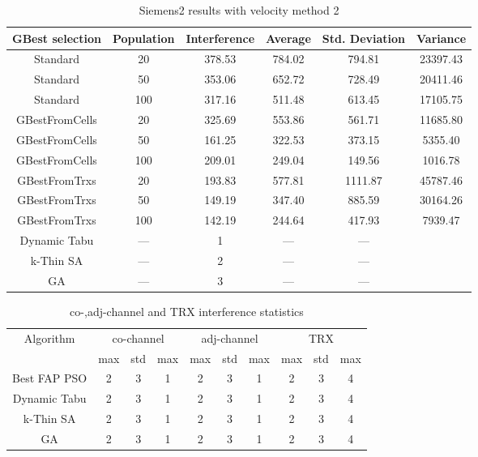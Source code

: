 \begin{table}[H]
\centering
	\begin{tabular}{cccccc}
	\toprule
    GBest selection & Population & Interference & Average & Std. Deviation & Variance \\
    \midrule
    Standard & 20 & 378.53 & 784.02 & 794.81 & 23397.43\\
    Standard & 50 & 353.06 & 652.72 & 728.49 & 20411.46\\
    Standard & 100 & 317.16 & 511.48 & 613.45 & 17105.75\\
    GBestFromCells & 20 & 325.69 & 553.86 & 561.71 & 11685.80\\
    GBestFromCells & 50 & 161.25 & 322.53 & 373.15 & 5355.40\\
    GBestFromCells & 100 & 209.01 & 249.04 & 149.56 & 1016.78\\
    GBestFromTrxs & 20 & 193.83 & 577.81 & 1111.87 & 45787.46\\
    GBestFromTrxs & 50 & 149.19 & 347.40 & 885.59 & 30164.26\\
    GBestFromTrxs & 100 & 142.19 & 244.64 & 417.93 & 7939.47\\
    Dynamic Tabu & --- & 1 & --- & --- \\
    k-Thin SA & --- & 2 & --- & --- \\
    GA & --- & 3 & --- & --- \\
    \bottomrule
	\end{tabular}
\caption{Siemens2 results with velocity method 2}
\label{tab:siem2m2}
\end{table}
\begin{table}[H]
\centering
	\begin{tabular}{cccccccccc}
	\toprule
    Algorithm & \multicolumn{3}{c}{co-channel} & \multicolumn{3}{c}{adj-channel} & \multicolumn{3}{c}{TRX}\\
              & max & std & max
              & max & std & max
              & max & std & max\\
    \midrule
    Best FAP PSO & 2 & 3 & 1 & 2 & 3 & 1 & 2 & 3 & 4\\ \hline
    Dynamic Tabu & 2 & 3 & 1 & 2 & 3 & 1 & 2 & 3 & 4\\\hline
    k-Thin SA & 2 & 3 & 1 & 2 & 3 & 1 & 2 & 3 & 4\\\hline
    GA & 2 & 3 & 1 & 2 & 3 & 1 & 2 & 3 & 4\\\hline
    \bottomrule
	\end{tabular}
\caption{co-,adj-channel and TRX interference statistics}
\label{tab:stats-siem2m1}
\end{table}
